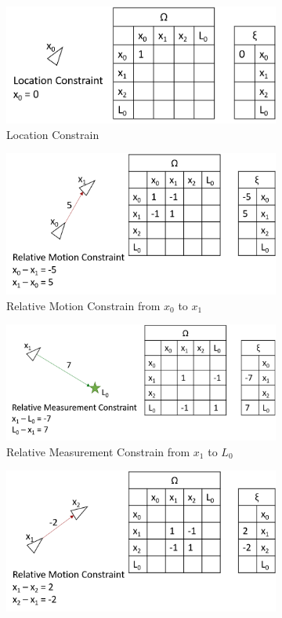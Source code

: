 \begin{figure}[H]
\centering
\begin{subfigure}{.5\textwidth}
  \centering
  \includegraphics[width=.8\linewidth]{billeder/GraphSLAM04_1.png}
  \caption{Location Constrain}
  \label{SLAM_fig04:sub1}
\end{subfigure}%
\begin{subfigure}{.5\textwidth}
  \centering
  \includegraphics[width=.8\linewidth]{billeder/GraphSLAM04_2.png}
  \caption{Relative Motion Constrain from $x_0$ to $x_1$}
  \label{SLAM_fig04:sub2}
\end{subfigure}
\begin{subfigure}{.5\textwidth}
  \centering
  \includegraphics[width=.8\linewidth]{billeder/GraphSLAM04_3.png}
  \caption{Relative Measurement Constrain from $x_1$ to $L_0$}
  \label{SLAM_fig04:sub3}
\end{subfigure}%
\begin{subfigure}{.5\textwidth}
  \centering
  \includegraphics[width=.8\linewidth]{billeder/GraphSLAM04_4.png}

\end{subfigure}
\end{figure}
